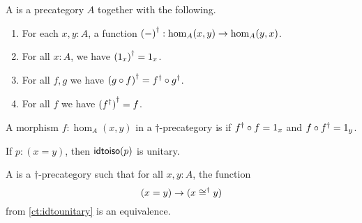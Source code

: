 \documentclass[hott-all.tex]{subfiles}
\begin{document}

\begin{defn}
  A 
  is a precategory $A$ together with the following.
  \begin{enumerate}
  \item For each $x,y:A$, a function ${(-)}^{\dagger}:\hom_A(x,y) \to \hom_A(y,x)$.
  \item For all $x:A$, we have ${(1_x)}^{\dagger} = 1_x$.
  \item For all $f,g$ we have ${(g\circ f)}^{\dagger} = {f}^{\dagger} \circ {g}^{\dagger}$.
  \item For all $f$ we have ${({f}^{\dagger})}^{\dagger} = f$.
  \end{enumerate}
\end{defn}

\begin{defn}
  A morphism $f:\hom_A(x,y)$ in a $\dagger$-precategory is 
  if ${f}^{\dagger} \circ f = 1_x$ and $f\circ {f}^{\dagger} = 1_y$.
\end{defn}


\begin{lem}
  If $p:(x=y)$, then $\mathsf{idtoiso}(p)$ is unitary.
\end{lem}

\begin{defn}
  A 
  is a $\dagger$-precategory such that for all $x,y:A$, the function
  \[ (x=y) \to (x \mathrel{\cong^\dagger} y) \]
  from \cref{ct:idtounitary} is an equivalence.
\end{defn}
\end{document}
